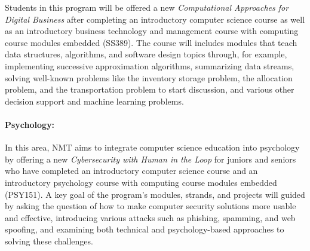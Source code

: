 Students in this program will be offered a new \textit{Computational Approaches for Digital Business} after completing an introductory computer science course
as well as an introductory business technology and management course with computing course modules embedded (SS389). The course will includes modules that teach data structures, algorithms, and software design topics through, for example, implementing successive approximation algorithms, 
summarizing data streams, %
solving well-known problems like the inventory storage problem, the allocation problem, and the transportation problem to start discussion, and various other decision support and machine learning problems.

\paragraph{Psychology:}
In this area, NMT aims to integrate computer science education into psychology by offering a new \textit{Cybersecurity with Human in the Loop} for juniors and seniors who have completed an introductory computer science course and an introductory psychology course with computing course modules embedded (PSY151). 
A key goal of the program's modules, strands, and projects will guided by asking the question of how to make computer security solutions more usable and effective, introducing various attacks such as phishing, spamming, and web spoofing, and examining both technical and psychology-based approaches to solving these challenges.
